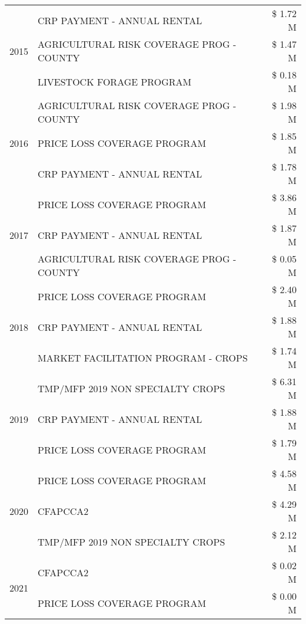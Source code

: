 \begin{tabular}{llr}
\cline{1-3}
\multirow[t]{3}{*}{2015} & CRP PAYMENT - ANNUAL RENTAL & \$ 1.72 M \\
 & AGRICULTURAL RISK COVERAGE PROG - COUNTY & \$ 1.47 M \\
 & LIVESTOCK FORAGE PROGRAM & \$ 0.18 M \\
\cline{1-3}
\multirow[t]{3}{*}{2016} & AGRICULTURAL RISK COVERAGE PROG - COUNTY & \$ 1.98 M \\
 & PRICE LOSS COVERAGE PROGRAM & \$ 1.85 M \\
 & CRP PAYMENT - ANNUAL RENTAL & \$ 1.78 M \\
\cline{1-3}
\multirow[t]{3}{*}{2017} & PRICE LOSS COVERAGE PROGRAM & \$ 3.86 M \\
 & CRP PAYMENT - ANNUAL RENTAL & \$ 1.87 M \\
 & AGRICULTURAL RISK COVERAGE PROG - COUNTY & \$ 0.05 M \\
\cline{1-3}
\multirow[t]{3}{*}{2018} & PRICE LOSS COVERAGE PROGRAM & \$ 2.40 M \\
 & CRP PAYMENT - ANNUAL RENTAL & \$ 1.88 M \\
 & MARKET FACILITATION PROGRAM - CROPS & \$ 1.74 M \\
\cline{1-3}
\multirow[t]{3}{*}{2019} & TMP/MFP 2019 NON SPECIALTY CROPS & \$ 6.31 M \\
 & CRP PAYMENT - ANNUAL RENTAL & \$ 1.88 M \\
 & PRICE LOSS COVERAGE PROGRAM & \$ 1.79 M \\
\cline{1-3}
\multirow[t]{3}{*}{2020} & PRICE LOSS COVERAGE PROGRAM & \$ 4.58 M \\
 & CFAPCCA2 & \$ 4.29 M \\
 & TMP/MFP 2019 NON SPECIALTY CROPS & \$ 2.12 M \\
\cline{1-3}
\multirow[t]{2}{*}{2021} & CFAPCCA2 & \$ 0.02 M \\
 & PRICE LOSS COVERAGE PROGRAM & \$ 0.00 M \\
\cline{1-3}
\bottomrule
\end{tabular}
